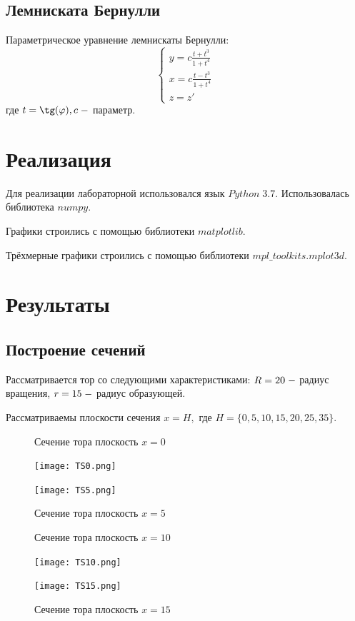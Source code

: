 \documentclass[a4]{article}
\begin{document}
\subsection{Лемниската Бернулли}
Параметрическое уравнение лемнискаты Бернулли: \hfill\cite{source}
\begin{equation}
    \begin{cases}
    y=c\frac{t+t^3}{1+t^4}\\
    x=c\frac{t-t^3}{1+t^4}\\
    z=z'
    \end{cases}
\end{equation}
где $t=\tg(\varphi), c\;\--$ параметр.

\section{Реализация}
Для реализации лабораторной использовался язык $Python\;3.7$. Использовалась библиотека $numpy.$\hfill\cite{numpy} 

Графики строились с помощью библиотеки $matplotlib.$ \hfill\cite{plotlib}

Трёхмерные графики строились с помощью библиотеки $mpl\_toolkits.mplot3d.$\hfill \cite{plot3}


\newpage
\section{Результаты}
\subsection{Построение сечений}
Рассматривается тор со следующими характеристиками: $R=20\;\--$ радиус вращения, $r=15\;\--$ радиус образующей.

Рассматриваемы плоскости сечения $x = H,$ где $H=\{0, 5, 10, 15, 20, 25, 35\}.$

\begin{figure}[H]
\begin{center}
\caption{Сечение тора плоскость $x=0$ }
\texttt{[image: TS0.png]} 

\caption{Сечение тора плоскость $x=5$ }
\texttt{[image: TS5.png]} 
\end{center}
\end{figure}


\begin{figure}[H]
\caption{Сечение тора плоскость $x=10$ }
\texttt{[image: TS10.png]} 

\caption{Сечение тора плоскость $x=15$ }
\texttt{[image: TS15.png]} 
\end{figure}
\end{document}
